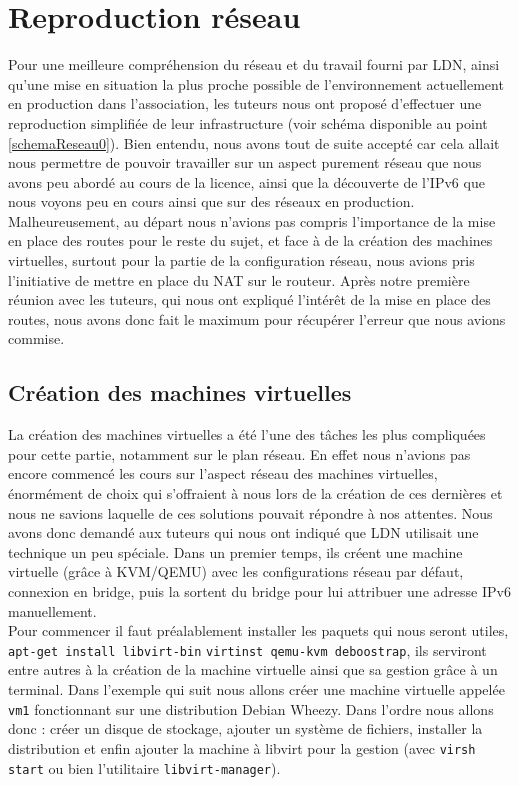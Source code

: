 \section{Reproduction réseau}
	\vspace{0.3cm}
	Pour une meilleure compréhension du réseau et du travail fourni par LDN, ainsi qu'une mise en situation la plus proche possible de l'environnement actuellement en production dans l'association, les tuteurs nous ont proposé d'effectuer une reproduction simplifiée de leur infrastructure (voir schéma disponible au point \ref{schemaReseau0}). Bien entendu, nous avons tout de suite accepté car cela allait nous permettre de pouvoir travailler sur un aspect purement réseau que nous avons peu abordé au cours de la licence, ainsi que la découverte de l'IPv6 que nous voyons peu en cours ainsi que sur des réseaux en production.\\

	Malheureusement, au départ nous n'avions pas compris l'importance de la mise en place des routes pour le reste du sujet, et face à de la création des machines virtuelles, surtout pour la partie de la configuration réseau, nous avions pris l'initiative de mettre en place du NAT sur le routeur. Après notre première réunion avec les tuteurs, qui nous ont expliqué l'intérêt de la mise en place des routes, nous avons donc fait le maximum pour récupérer l'erreur que nous avions commise.\\

	\subsection{Création des machines virtuelles}
		\vspace{0.3cm}
		La création des machines virtuelles a été l'une des tâches les plus compliquées pour cette partie, notamment sur le plan réseau. En effet nous n'avions pas encore commencé les cours sur l'aspect réseau des machines virtuelles, énormément de choix qui s'offraient à nous lors de la création de ces dernières et nous ne savions laquelle de ces solutions pouvait répondre à nos attentes. Nous avons donc demandé aux tuteurs qui nous ont indiqué que LDN utilisait une technique un peu spéciale. Dans un premier temps, ils créent une machine virtuelle (grâce à KVM/QEMU) avec les configurations réseau par défaut, connexion en bridge, puis la sortent du bridge pour lui attribuer une adresse IPv6 manuellement.\\

		Pour commencer il faut préalablement installer les paquets qui nous seront utiles, \verb?apt-get install libvirt-bin? \verb?virtinst qemu-kvm deboostrap?, ils serviront entre autres à la création de la machine virtuelle ainsi que sa gestion grâce à un terminal. Dans l'exemple qui suit nous allons créer une machine virtuelle appelée \verb?vm1? fonctionnant sur une distribution Debian Wheezy. Dans l'ordre nous allons donc : créer un disque de stockage, ajouter un système de fichiers, installer la distribution et enfin ajouter la machine à libvirt pour la gestion (avec \verb?virsh start? ou bien l'utilitaire \verb?libvirt-manager?).\\

